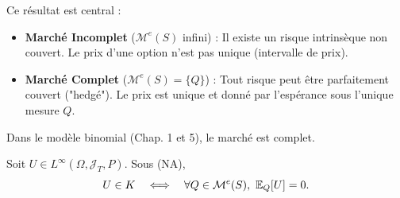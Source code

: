 \begin{tcolorbox}[title=Synthèse : Complétude et Unicité, colback=purple!5!white, colframe=purple!50!black]
Ce résultat est central :
\begin{itemize}
    \item \textbf{Marché Incomplet} ($\mathcal{M}^e(S)$ infini) : Il existe un risque intrinsèque non couvert. Le prix d'une option n'est pas unique (intervalle de prix).
    \item \textbf{Marché Complet} ($\mathcal{M}^e(S) = \{Q\}$) : Tout risque peut être parfaitement couvert ("hedgé"). Le prix est unique et donné par l'espérance sous l'unique mesure $Q$.
\end{itemize}
Dans le modèle binomial (Chap. 1 et 5), le marché est complet.
\end{tcolorbox}

\begin{lemme}\label{lem:10}
\label{lem:UinK_iff_EQ0}
Soit $U\in L^\infty(\Omega,\mathcal{J}_T,P)$. Sous (NA),
\begin{equation}
U\in K \quad \Longleftrightarrow \quad \forall Q\in\mathcal{M}^e(S),\ \mathbb{E}_Q[U]=0.
\end{equation}
\end{lemme}

